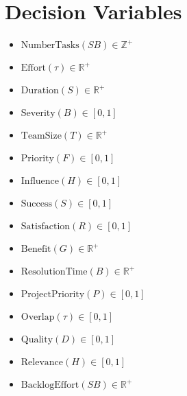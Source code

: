 \documentclass{article}
\begin{document}
\section{Decision Variables}
\begin{itemize}
    \item $ \text{NumberTasks}(SB) \in \mathbb{Z}^+ $
    \item $ \text{Effort}(\tau) \in \mathbb{R}^+ $
    \item $ \text{Duration}(S) \in \mathbb{R}^+ $
    \item $ \text{Severity}(B) \in [0, 1] $
    \item $ \text{TeamSize}(T) \in \mathbb{R}^+ $
    \item $ \text{Priority}(F) \in [0, 1] $
    \item $ \text{Influence}(H) \in [0, 1] $
    \item $ \text{Success}(S) \in [0, 1] $
    \item $ \text{Satisfaction}(R) \in [0, 1] $
    \item $ \text{Benefit}(G) \in \mathbb{R}^+ $
    \item $ \text{ResolutionTime}(B) \in \mathbb{R}^+ $
    \item $ \text{ProjectPriority}(P) \in [0, 1] $
    \item $ \text{Overlap}(\tau) \in [0, 1] $
    \item $ \text{Quality}(D) \in [0, 1] $
    \item $ \text{Relevance}(H) \in [0, 1] $
    \item $ \text{BacklogEffort}(SB) \in \mathbb{R}^+ $
\end{itemize}
\end{document}

